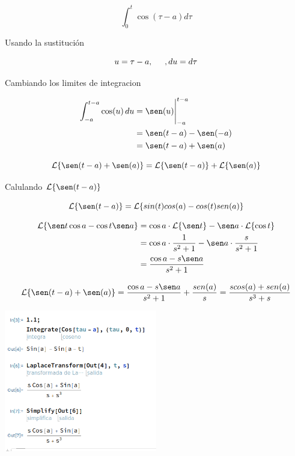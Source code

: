 \documentclass{article}
\begin{document}
\[ \int_{0}^{t} \cos(\tau - a) d\tau \]

Usando la sustitución

\[u = \tau - a, \hspace*{.5cm}, du = d\tau\]

Cambiando los limites de integracion

\begin{align*}
    \int_{-a}^{t-a} \cos(u) \, du & = \sen(u) \Bigg|_{-a}^{t-a} \\
                                  & = \sen(t-a) - \sen(-a)      \\
                                  & = \sen(t-a) + \sen(a)       \\
\end{align*}

\[
    \mathcal{L}\{\sen(t-a) + \sen(a)\} = \mathcal{L}\{\sen(t-a)\} + \mathcal{L}\{\sen(a)\}
\]

Calulando $\mathcal{L}\{\sen(t-a)\}$

\[
    \mathcal{L}\{\sen(t-a)\} = \mathcal{L}\{sin(t)cos(a) - cos(t)sen(a)\}
\]

\[
    \begin{aligned}
        \mathcal{L}\{\sen t \cos a - \cos t \sen a\} & = \cos a \cdot \mathcal{L}\{\sen t\} - \sen a \cdot \mathcal{L}\{\cos t\} \\
                                                     & = \cos a \cdot \frac{1}{s^2 + 1} - \sen a \cdot \frac{s}{s^2 + 1}         \\
                                                     & = \frac{\cos a - s \sen a}{s^2 + 1}
    \end{aligned}
\]

\[
    \mathcal{L}\{\sen(t-a) + \sen(a)\} = \frac{\cos a - s \sen a}{s^2 + 1} + \frac{sen(a)}{s} = \frac{scos(a) + sen(a)}{s^3+s}
\]

\begin{center}
    \includegraphics[width=0.5\textwidth]{./image5.png}
\end{center}
\end{document}
